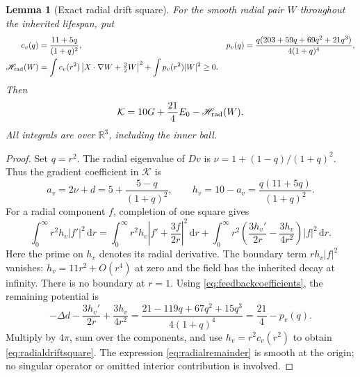 \documentclass[11pt]{article}
\numberwithin{equation}{section}
\newtheorem{lemma}[theorem]{Lemma}
\newcommand{\dd}{\,\mathrm d}
\newcommand{\R}{\mathbb R}
\begin{document}
\begin{lemma}[Exact radial drift square]\label{lem:radialdriftsquare}
For the smooth radial pair $W$ throughout the inherited lifespan, put
\begin{align}
 c_v(q)&=\frac{11+5q}{(1+q)^2},&
 p_v(q)&=\frac{q(203+59q+69q^2+21q^3)}{4(1+q)^4},\nonumber\\
 \mathscr H_{\rm rad}(W)&=
 \int c_v(r^2)\left|X\cdot\nabla W+\tfrac32W\right|^2
 +\int p_v(r^2)|W|^2\ge0.\label{eq:radialremainder}
\end{align}
Then
\begin{equation}\label{eq:radialdriftsquare}
 \mathcal K=10G+\frac{21}{4}E_0-\mathscr H_{\rm rad}(W).
\end{equation}
All integrals are over $\R^3$, including the inner ball.
\end{lemma}
\begin{proof}
Set $q=r^2$. The radial eigenvalue of $Dv$ is
$\nu=1+(1-q)/(1+q)^2$. Thus the gradient coefficient in $\mathcal K$
is
\[
 a_v=2\nu+d=5+\frac{5-q}{(1+q)^2},\qquad
 h_v=10-a_v=\frac{q(11+5q)}{(1+q)^2}.
\]
For a radial component $f$, completion of one square gives
\[
 \int_0^\infty r^2h_v|f'|^2\dd r
 =\int_0^\infty r^2h_v\left|f'+\frac{3f}{2r}\right|^2\dd r
 +\int_0^\infty r^2
  \left(\frac{3h_v'}{2r}-\frac{3h_v}{4r^2}\right)|f|^2\dd r.
\]
Here the prime on $h_v$ denotes its radial derivative. The boundary
term $rh_v|f|^2$ vanishes: $h_v=11r^2+O(r^4)$ at zero and the field
has the inherited decay at infinity. There is no boundary at $r=1$.
Using \eqref{eq:feedbackcoefficients}, the remaining potential is
\[
 -\Delta d-\frac{3h_v'}{2r}+\frac{3h_v}{4r^2}
 =\frac{21-119q+67q^2+15q^3}{4(1+q)^4}
 =\frac{21}{4}-p_v(q).
\]
Multiply by $4\pi$, sum over the components, and use
$h_v=r^2c_v(r^2)$ to obtain \eqref{eq:radialdriftsquare}.
The expression \eqref{eq:radialremainder} is smooth at the origin;
no singular operator or omitted interior contribution is involved.
\end{proof}
\end{document}
